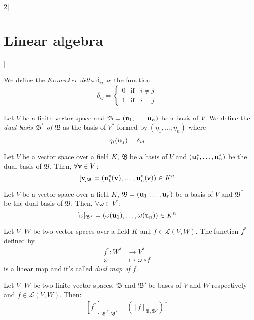 \documentclass[../../../main.tex]{subfiles}
\begin{document}
\begin{multicols}{2}[\section{Linear algebra}]
\begin{prop}
  \end{prop}
  \begin{definition}
    We define the \textit{Kronecker delta $\delta_{ij}$} as the function: $$\delta_{ij}=\left\{
      \begin{array}{ccc}
        0 & \text{if} & i\ne j \\
        1 & \text{if} & i=j
      \end{array}
      \right.$$
  \end{definition}
  \begin{definition}
    Let $V$ be a finite vector space and $\mathfrak{B}=(\vb{u}_1,\ldots,\vb{u}_n)$ be a basis of $V$. We define the \textit{dual basis $\mathfrak{B}^*$ of $\mathfrak{B}$} as the basis of $V^*$ formed by $(\eta_1,\ldots,\eta_n)$ where $$\eta_i(\vb{u}_j)=\delta_{ij}$$
  \end{definition}
  \begin{lemma}
    Let $V$ be a vector space over a field $K$, $\mathfrak{B}$ be a basis of $V$ and $(\vb{u}_1^*,\ldots,\vb{u}_n^*)$ be the dual basis of $\mathfrak{B}$. Then, $\forall \vb{v}\in V$: $$[\vb{v}]_\mathfrak{B}=(\vb{u}_1^*(\vb{v}),\ldots,\vb{u}_n^*(\vb{v}))\in K^n$$
  \end{lemma}
  \begin{lemma}
    Let $V$ be a vector space over a field $K$, $\mathfrak{B}=(\vb{u}_1,\ldots,\vb{u}_n)$ be a basis of $V$ and $\mathfrak{B}^*$ be the dual basis of $\mathfrak{B}$. Then, $\forall \omega\in V^*$: $$[\omega]_{\mathfrak{B}^*}=(\omega(\vb{u}_1),\ldots,\omega(\vb{u}_n))\in K^n$$
  \end{lemma}
  \begin{definition}
    Let $V$, $W$ be two vector spaces over a field $K$ and $f\in \mathcal{L}(V,W)$. The function $f^*$ defined by
    \begin{align*}
      f^*:W^* & \longrightarrow V^*      \\
      \omega  & \longmapsto\omega\circ f
    \end{align*}
    is a linear map and it's called \textit{dual map of $f$}.
  \end{definition}
  \begin{theorem}
    Let $V$, $W$ be two finite vector spaces, $\mathfrak{B}$ and $\mathfrak{B}'$ be bases of $V$ and $W$ respectively and $f\in\mathcal{L}(V,W)$. Then: $$[f^*]_{\mathfrak{B}'^*,\mathfrak{B}^*}={([f]_{\mathfrak{B},\mathfrak{B}'})}^\mathrm{T}$$
  \end{theorem}

\end{multicols}
\end{document}
